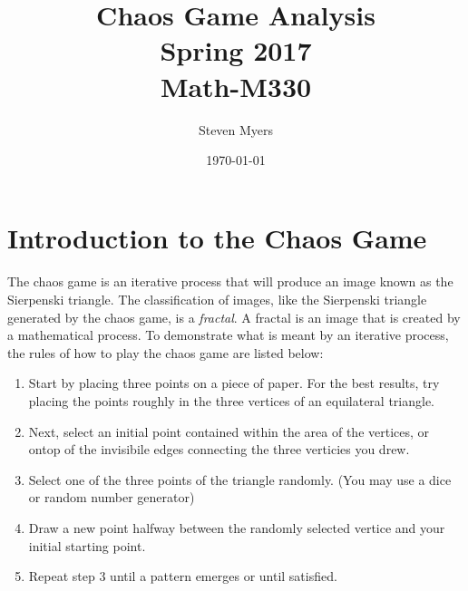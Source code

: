 \documentclass{article}
\begin{document}
\title{Chaos Game Analysis\\ Spring 2017\\ Math-M330}         %
\author{Steven Myers}        %
\date{\today}          %
\maketitle


\makeatother     %

\pagestyle{plain}

\section*{Introduction to the Chaos Game}

\paragraph{}
The chaos game is an iterative process that will produce an image known as the Sierpenski triangle. The classification of images, like the Sierpenski triangle generated by the chaos game, is a \textit{fractal}. A fractal is an image that is created by a mathematical process. To demonstrate what is meant by an iterative process, the rules of how to play the chaos game are listed below:
\begin{enumerate}
    \item
    Start by placing three points on a piece of paper. For the best results, try placing the points roughly in the three vertices of an equilateral triangle.
    \item
    Next, select an initial point contained within the area of the vertices, or ontop of the invisibile edges connecting the three verticies you drew.
    \item
    Select one of the three points of the triangle randomly. (You may use a dice or random number generator)
    \item
    Draw a new point halfway between the randomly selected vertice and your initial starting point.
    \item
    Repeat step 3 until a pattern emerges or until satisfied.
\end{enumerate}
\end{document}
